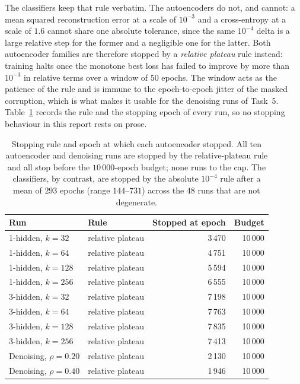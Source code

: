 \documentclass[11pt,a4paper]{article}
\begin{document}
The classifiers keep that rule verbatim.  The autoencoders do not, and cannot: a mean squared
reconstruction error at a scale of $10^{-3}$ and a cross-entropy at a scale of $1.6$ cannot share
one absolute tolerance, since the same $10^{-4}$ delta is a large relative step for the former and
a negligible one for the latter.  Both autoencoder families are therefore stopped by a
\emph{relative plateau} rule instead: training halts once the monotone best loss has failed to
improve by more than $10^{-3}$ in relative terms over a window of $50$ epochs.  The window acts as
the patience of the rule and is immune to the epoch-to-epoch jitter of the masked corruption, which
is what makes it usable for the denoising runs of Task~5.  Table~\ref{tab:stopconv} records the rule
and the stopping epoch of every run, so no stopping behaviour in this report rests on prose.

\begin{table}[htbp]\centering\small
\caption{Stopping rule and epoch at which each autoencoder stopped.  All ten autoencoder and
denoising runs are stopped by the relative-plateau rule and all stop before the $10\,000$-epoch
budget; none runs to the cap.  The classifiers, by contrast, are stopped by the absolute
$10^{-4}$ rule after a mean of $293$ epochs (range $144$--$731$) across the $48$ runs that are not
degenerate.}\label{tab:stopconv}
\begin{tabular}{@{}llrr@{}}
\toprule Run & Rule & Stopped at epoch & Budget \\ \midrule
1-hidden, $k=32$   & relative plateau & 3\,470 & 10\,000 \\
1-hidden, $k=64$   & relative plateau & 4\,751 & 10\,000 \\
1-hidden, $k=128$  & relative plateau & 5\,594 & 10\,000 \\
1-hidden, $k=256$  & relative plateau & 6\,555 & 10\,000 \\
3-hidden, $k=32$   & relative plateau & 7\,198 & 10\,000 \\
3-hidden, $k=64$   & relative plateau & 7\,763 & 10\,000 \\
3-hidden, $k=128$  & relative plateau & 7\,835 & 10\,000 \\
3-hidden, $k=256$  & relative plateau & 7\,413 & 10\,000 \\ \midrule
Denoising, $\rho=0.20$ & relative plateau & 2\,130 & 10\,000 \\
Denoising, $\rho=0.40$ & relative plateau & 1\,946 & 10\,000 \\ \bottomrule
\end{tabular}
\end{table}
\end{document}

